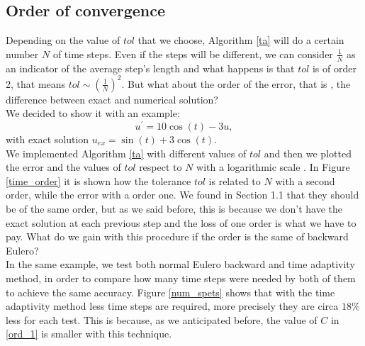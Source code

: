 \subsection{Order of convergence}
Depending on the value of $ tol $ that we choose, Algorithm \ref{ta} will do a certain number $ N $ of time steps. Even if the steps will be different, we can consider $ \frac{1}{N} $ as an indicator of the average step's length and what happens is that $ tol$ is of order 2, that means $ tol \sim (\frac{1}{N})^2 $. But what about the order of the error, that is , the difference between exact and numerical solution? \\
We decided to show it with an example:
\begin{equation*}
u^\prime = 10 \cos (t) - 3u,
\end{equation*}
with exact solution $ u_{ex} = \sin (t) + 3 \cos (t) $. \\
We implemented Algorithm \ref{ta} with different values of $ tol $ and then we plotted the error and the values of $ tol $  respect to $ N $ with a logarithmic scale .
In Figure \ref{time_order} it is shown how the tolerance $ tol $ is related to $ N $ with a second order, while the error with a order one. We found in Section 1.1 that they should be of the same order, but as we said before, this is because we don't have the exact solution at each previous step and the loss of one order is what we have to pay. What do we gain with this procedure if the order is the same of backward Eulero?\\
In the same example, we test both normal Eulero backward and time adaptivity method, in order to compare how many time steps were needed by both of them to achieve the same accuracy. Figure \ref{num_spets} shows that with the time adaptivity method less time steps are required, more precisely they are circa $ 18\% $ less for each test. This is because, as we anticipated before, the value of $ C $ in \eqref{ord_1} is smaller with this technique.
